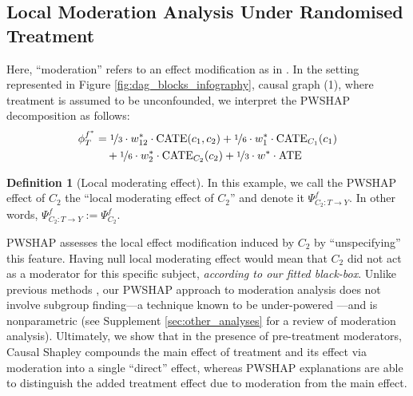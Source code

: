 \documentclass{article}
\theoremstyle{plain}
\theoremstyle{definition}
\newtheorem{definition}[theorem]{Definition}
\theoremstyle{remark}
\newcommand{\effect}{\Psi}
\theoremstyle{mystyle}
\begin{document}
\subsection{Local Moderation Analysis Under Randomised Treatment}
\label{sec:local_moderation}
Here, ``moderation'' refers to an effect modification as in . %
In the setting represented in Figure \ref{fig:dag_blocks_infography}, causal graph (1), where treatment is assumed to be unconfounded, we interpret the PWSHAP decomposition as follows:
\begin{align*} 
    \phi_T^{f^*}
    &= \nicefrac{1}{3} \cdot w^*_{12} \cdot \text{CATE}(c_1,c_2) + \nicefrac{1}{6} \cdot w^*_1 \cdot \text{CATE}_{C_1}(c_1) \\
    &\ \ \ + \nicefrac{1}{6} \cdot w^*_2 \cdot \text{CATE}_{C_2}(c_2) + \nicefrac{1}{3} \cdot w^* \cdot \text{ATE}
\end{align*} 
\begin{definition}[Local moderating effect] \label{def:local_moderating_effect} In this example, we call the PWSHAP effect of $C_2$ the ``local moderating effect of $C_2$'' and denote it $\effect^f_{C_2: T \rightarrow Y}$. In other words, $
\effect^f_{C_2: T \rightarrow Y} := \effect^f_{C_2}$.
\end{definition}
PWSHAP assesses the local effect modification induced by $C_2$ by ``unspecifying'' this feature. %
Having null local moderating effect would mean that $C_2$ did not act as a moderator for this specific subject, \emph{according to our fitted black-box}. 
Unlike previous methods , our PWSHAP approach to moderation analysis does not involve subgroup finding---a technique known to be under-powered ---and is nonparametric (see Supplement \ref{sec:other_analyses} for a review of moderation analysis). Ultimately, we show that in the presence of pre-treatment moderators, Causal Shapley compounds the main effect of treatment and its effect via moderation into a single ``direct'' effect, whereas PWSHAP explanations are able to distinguish the added treatment effect due to moderation from the main effect. 
\end{document}
